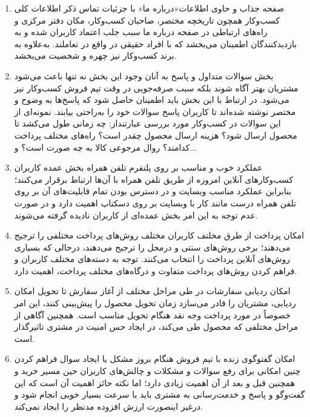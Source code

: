 \documentclass[14pt]{article}
\begin{document}
\begin{flushright}
\begin{enumerate}
\item صفحه جذاب و حاوی اطلاعات«درباره ما» با جزئیات تماس
\newline
ذکر اطلاعات کلی کسب‌وکار همچون تاریخچه مختصر، صاحبان کسب‌وکار، مکان دفتر مرکزی و راه‌های ارتباطی در صفحه درباره ما سبب جلب اعتماد کاربران شده و به بازدیدکنندگان اطمینان می‌بخشد که با افراد حقیقی در واقع در تعاملند. به‌علاوه به برند کسب‌وکار نیز چهره و شخصیت می‌بخشد.
\item بخش سوالات متداول و پاسخ به آنان
\newline
وجود این بخش نه تنها باعث می‌شود مشتریان بهتر آگاه شوند بلکه سبب صرفه‌جویی در وقت تیم فروش کسب‌وکار نیز می‌شود. در ارتباط با این بخش باید اطمینان حاصل شود که پاسخ‌ها به وضوح و مختصر نوشته شده‌اند تا کاربران پاسخ سوالات خود را به‌راحتی بیابند. نمونه‌ای از این سوالات در کسب‌وکار مورد بررسی عبارتنداز: چه زمانی طول می‌کشد تا محصول ارسال شود؟ هزینه ارسال محصول چقدر است؟ راه‌های مختلف پرداخت کدامند؟ روال مرجوعی کالا به چه صورت است؟ و...
\item عملکرد خوب و مناسب بر روی پلتفرم تلفن همراه
\newline
بخش عمده کاربران کسب‌وکارهای آنلاین امروزه از طریق تلفن همراه با آن‌ها ارتباط برقرار می‌کنند؛ بنابراین عملکرد مناسب وبسایت و در دسترس بودن تمام قابلیت‌های آن بر روی تلفن همراه درست مانند کار با وبسایت بر روی دسکتاپ اهمیت دارد و در صورت عدم توجه به این امر بخش عمده‌ای از کاربران نادیده گرفته می‌شوند.
\item امکان پرداخت از طرق مخلتف
\newline
کاربران مختلف روش‌های پرداخت مختلفی را ترجیح می‌دهند؛ برخی روش‌های سنتی و درمحل را ترجیح می‌دهند، درحالی که بسیاری روش‌های آنلاین پرداخت را انتخاب می‌کنند. توجه به دسته‌های مختلف کاربران و فراهم کردن روش‌های پرداخت متفاوت و درگاه‌های مختلف پرداخت،‌ اهمیت دارد.
\item امکان ردیابی سفارشات در طی مراحل مختلف از آغاز سفارش تا تحویل
\newline
امکان ردیابی، مشتریان را قادر می‌سازد زمان تحویل محصول را پیش‌بینی کنند، این امر خصوصاً در مورد پرداخت وجه نقد هنگام تحویل مناسب است. همچنین آگاهی از مراحل مختلفی که محصول طی می‌کند، در ایجاد حس امنیت در مشتری تاثیرگذار است.
\item امکان گفتوگوی زنده با تیم فروش هنگام بروز مشکل یا ایجاد سوال
\newline
فراهم کردن چنین امکانی برای رفع سوالات و مشکلات و چالش‌های کاربران حین مسیر خرید و همچنین قبل و بعد از آن اهمیت زیادی دارد؛ اما نکته حائز اهمیت آن است که این گفت‌وگو و پاسخ و خدمت‌رسانی به مشتری باید با سرعت بسیار خوبی انجام شود و درغیر اینصورت ارزش افزوده مدنظر را ایجاد نمی‌کند.

\end{enumerate}
\end{flushright}
\end{document}
